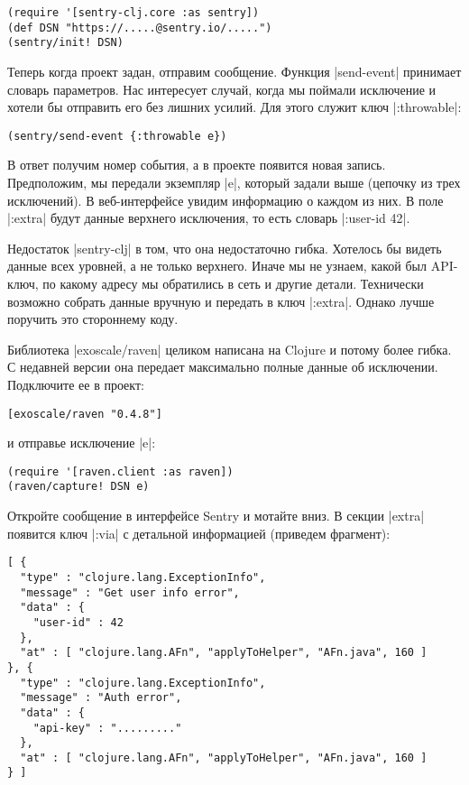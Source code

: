 \begin{verbatim}
(require '[sentry-clj.core :as sentry])
(def DSN "https://.....@sentry.io/.....")
(sentry/init! DSN)
\end{verbatim}

Теперь когда проект задан, отправим сообщение. Функция \spverb|send-event|
принимает словарь параметров. Нас интересует случай, когда мы поймали исключение
и хотели бы отправить его без лишних усилий. Для этого служит ключ
\spverb|:throwable|:

\begin{verbatim}
(sentry/send-event {:throwable e})
\end{verbatim}

В ответ получим номер события, а в проекте появится новая запись. Предположим,
мы передали экземпляр \spverb|e|, который задали выше (цепочку из трех
исключений). В веб-интерфейсе увидим информацию о каждом из них. В поле
\spverb|:extra| будут данные верхнего исключения, то есть словарь
\spverb|{:user-id 42}|.

Недостаток \spverb|sentry-clj| в том, что она недостаточно гибка. Хотелось бы
видеть данные всех уровней, а не только верхнего. Иначе мы не узнаем, какой был
API-ключ, по какому адресу мы обратились в сеть и другие детали. Технически
возможно собрать данные вручную и передать в ключ \spverb|:extra|. Однако лучше
поручить это стороннему коду.

Библиотека \spverb|exoscale/raven| целиком написана на Clojure и потому более
гибка. С недавней версии она передает максимально полные данные об
исключении. Подключите ее в проект:

\begin{verbatim}
[exoscale/raven "0.4.8"]
\end{verbatim}

\noindent
и отправье исключение \spverb|e|:

\begin{verbatim}
(require '[raven.client :as raven])
(raven/capture! DSN e)
\end{verbatim}

Откройте сообщение в интерфейсе Sentry и мотайте вниз. В секции \spverb|extra|
появится ключ \spverb|:via| с детальной информацией (приведем фрагмент):

\begin{verbatim}
[ {
  "type" : "clojure.lang.ExceptionInfo",
  "message" : "Get user info error",
  "data" : {
    "user-id" : 42
  },
  "at" : [ "clojure.lang.AFn", "applyToHelper", "AFn.java", 160 ]
}, {
  "type" : "clojure.lang.ExceptionInfo",
  "message" : "Auth error",
  "data" : {
    "api-key" : "........."
  },
  "at" : [ "clojure.lang.AFn", "applyToHelper", "AFn.java", 160 ]
} ]
\end{verbatim}

